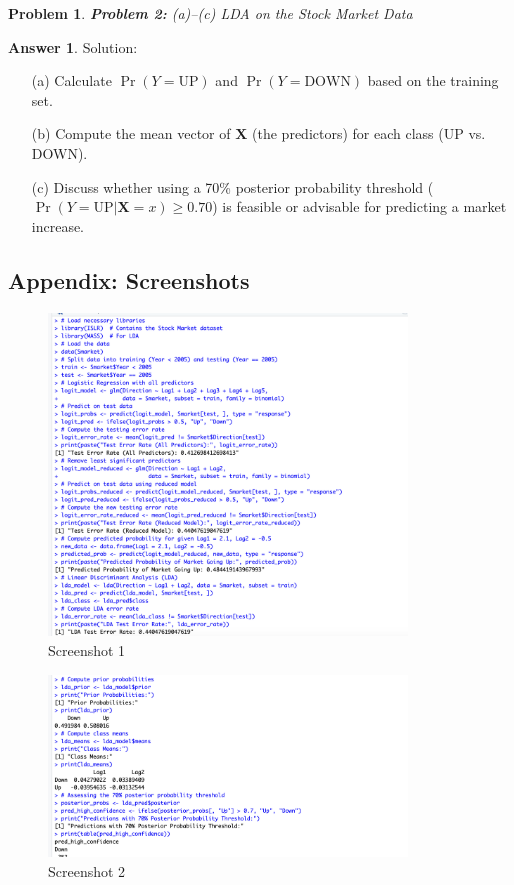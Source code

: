 \documentclass[12pt]{article}
\newtheorem{problem}{Problem} %
\theoremstyle{definition}
\newtheorem*{answer}{Answer}
\newcommand{\solution}{\textcolor{PineGreen}{Solution:\newline}}
\begin{document}
\setcounter{problem}{1}
\begin{problem}
\textbf{Problem 2:} (a)--(c) LDA on the Stock Market Data
\end{problem}

\begin{answer}
\solution
\begin{itemize}
    \item[(a)] Calculate \(\Pr(Y = \text{UP})\) and \(\Pr(Y = \text{DOWN})\) based on the training set.
    \item[(b)] Compute the mean vector of \(\mathbf{X}\) (the predictors) for each class (UP vs. DOWN).
    \item[(c)] Discuss whether using a 70\% posterior probability threshold (\(\Pr(Y=\text{UP}|\mathbf{X}=x) \ge 0.70\)) is feasible or advisable for predicting a market increase.
\end{itemize}
\end{answer}

\subsection*{Appendix: Screenshots}

\begin{figure}[htbp]
    \centering
    \includegraphics[width=0.85\textwidth]{Screenshot_2025-03-02_at_3.56.05_PM.png}
    \caption{Screenshot 1}
    \label{fig:screenshot1}
\end{figure}

\begin{figure}[htbp]
    \centering
    \includegraphics[width=0.85\textwidth]{Screenshot_2025-03-02_at_3.56.32_PM.png}
    \caption{Screenshot 2}
    \label{fig:screenshot2}
\end{figure}
\end{document}
